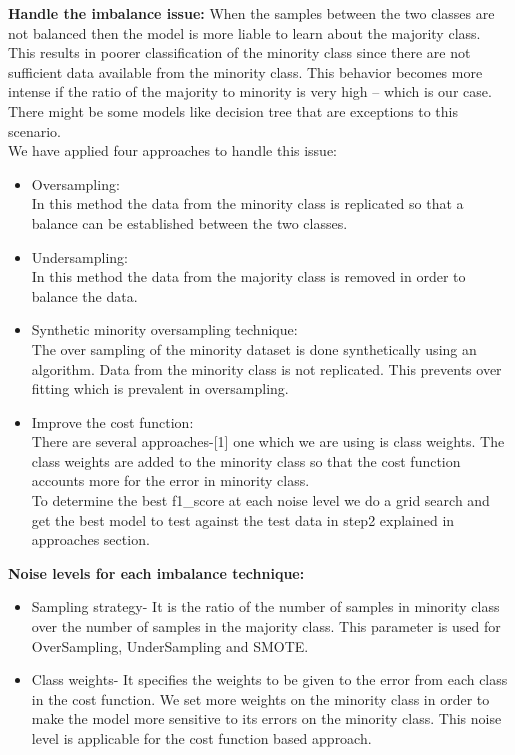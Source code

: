 \documentclass[fleqn,10pt]{SelfArx} %
\begin{document}
\noindent
\textbf{Handle the imbalance issue: }
When the samples between the two classes are not balanced then the model is more liable to learn about the majority class. This results in poorer classification of the minority class since there are not sufficient data available from the minority class. This behavior becomes more intense if the ratio of the majority to minority is very high – which is our case. There might be some models like decision tree that are exceptions to this scenario.\\

\noindent
We have applied four approaches to handle this issue:\\
\begin{itemize}
	\item Oversampling:\\
	In this method the data from the minority class is replicated so that a balance can be established between the two classes.
	\item Undersampling:\\
	In this method the data from the majority class is removed in order to balance the data.
	\item Synthetic minority oversampling technique:\\
	The over sampling of the minority dataset is done synthetically using an algorithm. Data from the minority class is not replicated. This prevents over fitting which is prevalent in oversampling.
	\item Improve the cost function:\\
	There are several approaches-[1] one which we are using is class weights. The class weights are added to the minority class so that the cost function accounts more for the error in minority class.\\
	To determine the best f1_score at each noise level we do a grid search and get the best model to test against the test data in step2 explained in approaches section.
\end{itemize}
\textbf{Noise levels for each imbalance technique: }
\begin{itemize}
	\item Sampling strategy- It is the ratio of the number of samples in minority class over the number of samples in the majority class. This parameter is used for OverSampling, UnderSampling and SMOTE.
	\item Class weights- It specifies the weights to be given to the error from each class in the cost function. We set more weights on the minority class in order to make the model more sensitive to its errors on the minority class. This noise level is applicable for the cost function based approach.\\
\end{itemize}	
\end{document}
